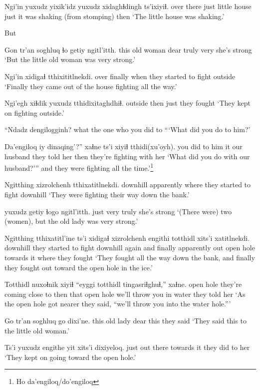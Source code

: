 \documentclass[12pt]{article}
\begin{document}
\gll Ngi'in yuxudz yixik'idz yuxudz xidaghɬdingh ts'ixiyiɬ.
{over there} just {little house} just {it was shaking (from stomping)} then
\glt `The little house was shaking.'
\glend

But

\gll Gon tr'an soghluq ɬo getiy ngitl'itth.
this {old woman} dear truly very {she's strong}
\glt `But the little old woman was very strong.'
\glend

\gll Ngi'in xidigaɬ tthixititlnekdi.
over finally {when they started to fight outside}
\glt `Finally they came out of the house fighting all the way.'
\glend

\gll Ngi'egh xiɬdik yuxudz tthidixitaghdhiɬ.
outside then just {they fought}
\glt `They kept on fighting outside.'
\glend

\gll ``Ndadz dengilogginh?
what {the one who you did to}
\glt ```What did you do to him?'
\glend

\gll Da'engiloq iy dinaqing'?'' xaɬne ts'i xiyiɬ tthidi(xu'oyh).
{you did to him} it {our husband} {they told her} {} then {they're fighting with her}
\glt `What did you do with our husband?''' and they were fighting all the time.'\footnote{Ho da'engiloq/do'engiloq}
\glend

\gll Ngitthing xizrolchenh tthixatitlnekdi.
downhill apparently {where they started to fight downhill}
\glt `They were fighting their way down the bank.'
\glend

 yuxudz getiy ɬogo ngitl'itth.
{} just very truly {she's strong}
\glt `(There were) two (women), but the old lady was very strong.'
\glend

\gll Ngitthing tthixatitl'ine ts'i xidigaɬ xizrolchenh engithi totthidl xits'i xatitlnekdi.
downhill {they started to fight downhill again} and finally apparently out {open hole} {towards it} {where they fought}
\glt `They fought all the way down the bank, and finally they fought out toward the open hole in the ice.'
\glend

\gll Totthidl nuxoɬnik xiyiɬ ``eyggi totthidl tingasriɬghuɬ,'' xaɬne.
{open hole} {they're coming close to} then that {open hole} {we'll throw you in water} {they told her}
\glt `As the open hole got nearer they said, ``we'll throw you into the water hole.'''
\glend

\gll Go tr'an soghluq go dixi'ne.
this {old lady} dear this {they said}
\glt `They said this to the little old woman.'
\glend

\gll Ts'i yuxudz engithe yit xits'i dixiyeloq.
{} just out there {towards it} {they did to her}
\glt `They kept on going toward the open hole.'
\glend
\end{document}
